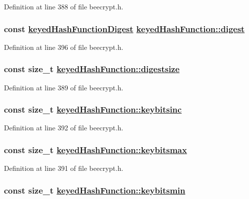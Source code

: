 Definition at line 388 of file beecrypt.h.\hypertarget{structkeyedHashFunction_o10}{
\subsubsection[digest]{\setlength{\rightskip}{0pt plus 5cm}const \hyperlink{beecrypt_8h_a14}{keyed\-Hash\-Function\-Digest} \hyperlink{structkeyedHashFunction_o10}{keyed\-Hash\-Function::digest}}}
\label{structkeyedHashFunction_o10}


Definition at line 396 of file beecrypt.h.\hypertarget{structkeyedHashFunction_o3}{
\subsubsection[digestsize]{\setlength{\rightskip}{0pt plus 5cm}const size\_\-t \hyperlink{structkeyedHashFunction_o3}{keyed\-Hash\-Function::digestsize}}}
\label{structkeyedHashFunction_o3}


Definition at line 389 of file beecrypt.h.\hypertarget{structkeyedHashFunction_o6}{
\subsubsection[keybitsinc]{\setlength{\rightskip}{0pt plus 5cm}const size\_\-t \hyperlink{structkeyedHashFunction_o6}{keyed\-Hash\-Function::keybitsinc}}}
\label{structkeyedHashFunction_o6}


Definition at line 392 of file beecrypt.h.\hypertarget{structkeyedHashFunction_o5}{
\subsubsection[keybitsmax]{\setlength{\rightskip}{0pt plus 5cm}const size\_\-t \hyperlink{structkeyedHashFunction_o5}{keyed\-Hash\-Function::keybitsmax}}}
\label{structkeyedHashFunction_o5}


Definition at line 391 of file beecrypt.h.\hypertarget{structkeyedHashFunction_o4}{
\subsubsection[keybitsmin]{\setlength{\rightskip}{0pt plus 5cm}const size\_\-t \hyperlink{structkeyedHashFunction_o4}{keyed\-Hash\-Function::keybitsmin}}}
\label{structkeyedHashFunction_o4}


